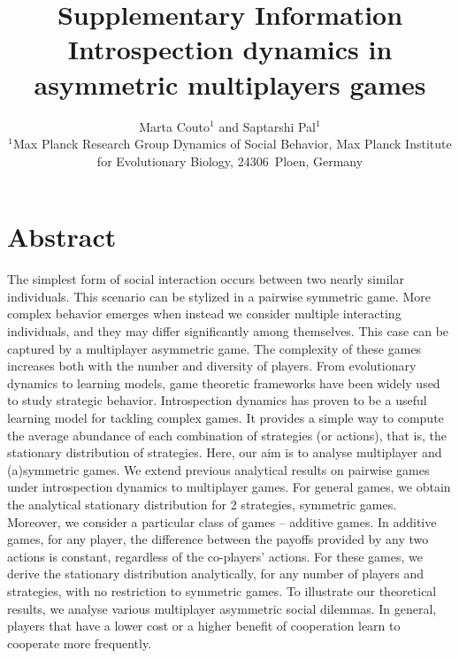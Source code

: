 \documentclass[11pt]{article}
\title{\sffamily \Large Supplementary Information\\[0.1cm] {\bfseries Introspection dynamics in asymmetric multiplayers games}}
\date{\empty}
\author{\parbox[c]{16cm}{\centering \onehalfspacing \fontsize{11}{12}\selectfont Marta Couto$^1$ and Saptarshi Pal$^1$\\[0.2cm]
$^1$Max Planck Research Group Dynamics of Social Behavior, Max Planck Institute for Evolutionary Biology, 24306~Ploen, Germany}}
\theoremstyle{plainCl1}
\theoremstyle{plainCl2}
\begin{document}
\maketitle
\onehalfspacing
\section*{Abstract}


The simplest form of social interaction occurs between two nearly similar individuals. This scenario can be stylized in a pairwise symmetric game. 
More complex behavior emerges when instead we consider multiple interacting individuals, and they may differ significantly among themselves. This case can be captured by a multiplayer asymmetric game. The complexity of these games increases both with the number and diversity of players.
From evolutionary dynamics to learning models, game theoretic frameworks have been widely used to study strategic behavior. 
Introspection dynamics has proven to be a useful learning model for tackling complex games. 
It provides a simple way to compute the average abundance of each combination of strategies (or actions), that is, the stationary distribution of strategies.
Here, our aim is to analyse multiplayer and (a)symmetric games.
We extend previous analytical results on pairwise games under introspection dynamics to multiplayer games. 
For general games, we obtain the analytical stationary distribution for 2 strategies, symmetric games.
Moreover, we consider a particular class of games -- additive games. 
In additive games, for any player, the difference between the payoffs provided by any two actions is constant, regardless of the co-players' actions. 
For these games, we derive the stationary distribution analytically, for any number of players and strategies, with no restriction to symmetric games. 
To illustrate our theoretical results, we analyse various multiplayer asymmetric social dilemmas. 
In general, players that have a lower cost or a higher benefit of cooperation learn to cooperate more frequently.

\end{document}
